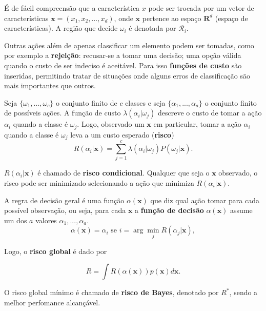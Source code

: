 É de fácil compreensão que a característica $x$ pode ser trocada por um vetor de características $\boldsymbol{x} = (x_1, x_2, ..., x_d)$, onde $\boldsymbol{x}$ pertence ao espaço $\boldsymbol{R}^d$ (espaço de características). A região que decide $\omega_i$ é denotada por $\mathcal{R}_i$.

Outras ações além de apenas classificar um elemento podem ser tomadas, como por exemplo a \textbf{rejeição}: recusar-se a tomar uma decisão; uma opção válida quando o custo de ser indeciso é aceitável. Para isso \textbf{funções de custo} são inseridas, permitindo tratar de situações onde alguns erros de classificação são mais importantes que outros.

Seja $\{\omega_1, ..., \omega_c\}$ o conjunto finito de $c$ classes e seja $\{\alpha_1, ..., \alpha_a\}$ o conjunto finito de possíveis ações. A função de custo $\lambda(\alpha_i|\omega_j)$ descreve o custo de tomar a ação $\alpha_i$ quando a classe é $\omega_j$. Logo, observado um $\boldsymbol{x}$ em particular, tomar a ação $\alpha_i$ quando a classe é $\omega_j$ leva a um custo esperado (\textbf{risco})
\begin{equation}
    R(\alpha_i|\boldsymbol{x}) = \sum_{j=1}^c \lambda(\alpha_i|\omega_j) P(\omega_j|\boldsymbol{x}).
    \label{eq:conditional_risk}
\end{equation}

$R(\alpha_i|\boldsymbol{x})$ é chamado de \textbf{risco condicional}. Qualquer que seja o $\boldsymbol{x}$ observado, o risco pode ser minimizado selecionando a ação que minimiza $R(\alpha_i|\boldsymbol{x})$.

A regra de decisão geral é uma função $\alpha(\boldsymbol{x})$ que diz qual ação tomar para cada possível observação, ou seja, para cada $\boldsymbol{x}$ a \textbf{função de decisão} $\alpha(\boldsymbol{x})$ assume um dos $a$ valores $\alpha_1, ..., \alpha_a$.
\begin{equation}
    \alpha(\boldsymbol{x}) = \alpha_i \text{ se } i = \arg\min_j R(\alpha_j|\boldsymbol{x}),
    \label{eq:decision_4}
\end{equation}

\noindent Logo, o \textbf{risco global} é dado por

\begin{equation}
    R = \int R(\alpha(\boldsymbol{x}))p(\boldsymbol{x})d\boldsymbol{x}.
    \label{eq:conditional_risk}
\end{equation}

O risco global mínimo é chamado de \textbf{risco de Bayes}, denotado por $R^*$, sendo a melhor perfomance alcançável.

